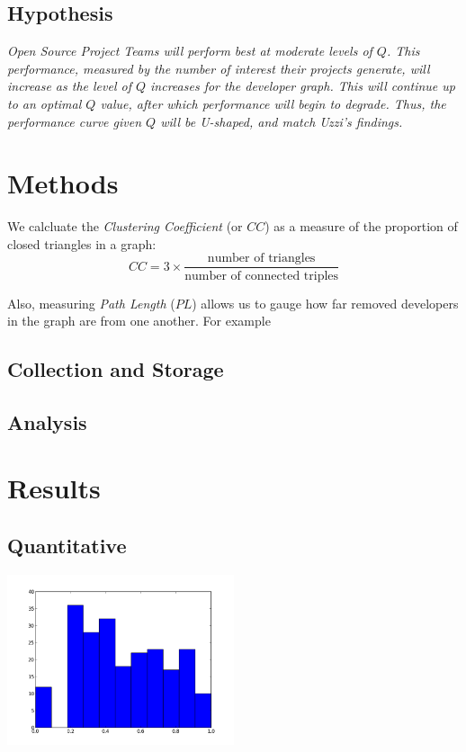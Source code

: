 \documentclass{proc}
\begin{document}
\subsection{Hypothesis}

\textit{Open Source Project Teams will perform best at moderate levels of $Q$. This performance, measured by the number of interest their projects generate, will increase as the level of $Q$ increases for the developer graph. This will continue up to an optimal $Q$ value, after which performance will begin to degrade. Thus, the performance curve given $Q$ will be U-shaped, and match Uzzi's findings\cite{uzzi2005collaboration}. }

\section{Methods}

We calcluate the \textit{Clustering Coefficient} (or $CC$) as a measure of the proportion of closed triangles in a graph\cite{newman2003structure}:
\[CC = 3 \times \frac{\text{number of triangles}}
                    {\text{number of connected triples}}\]

Also, measuring \textit{Path Length} ($PL$) allows us to gauge how far removed developers in the graph are from one another. For example 

\subsection{Collection and Storage}

\subsection{Analysis}

\section{Results}

\subsection{Quantitative}



\begin{center}
\includegraphics[width=0.5\textwidth]{images/github-popular.png}
\end{center}
\end{document}
